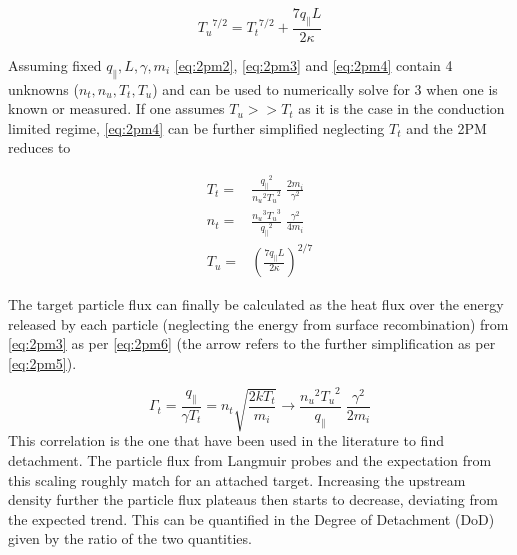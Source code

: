 \begin{equation}
{T_u}^{7/2} = {T_t}^{7/2} + \frac{7 q_{\parallel} L}{2 \kappa}
\label{eq:2pm4}
\end{equation}

Assuming fixed $q_{\parallel}, L, \gamma, m_i$ \autoref{eq:2pm2}, \ref{eq:2pm3} and \ref{eq:2pm4} contain 4 unknowns ($n_t, n_u, T_t, T_u$) and can be used to numerically solve for 3 when one is known or measured. If one assumes $T_u >> T_t$ as it is the case in the conduction limited regime, \autoref{eq:2pm4} can be further simplified neglecting $T_t$ and the 2PM reduces to

\begin{equation}
\begin{aligned}
T_t =& \frac{{q_{\parallel}}^2}{{n_u}^2 {T_u}^2} \; \frac{2m_i}{\gamma^2} \\
n_t =& \frac{{n_u}^3 {T_u}^3}{{q_{\parallel}}^2} \; \frac{\gamma^2}{4m_i} \\
T_u =& \left( \frac{7 q_{\parallel} L}{2 \kappa} \right)^{2/7}
\end{aligned}
\label{eq:2pm5}
\end{equation}

The target particle flux can finally be calculated as the heat flux over the energy released by each particle (neglecting the energy from surface recombination) from \autoref{eq:2pm3} as per \autoref{eq:2pm6} (the arrow refers to the further simplification as per \autoref{eq:2pm5}).

\begin{equation}
\Gamma_t = \frac{q_{\parallel}}{\gamma T_t} =  n_t \sqrt{\frac{2kT_t}{m_i}} \rightarrow \frac{{n_u}^2 {T_u}^2}{q_{\parallel}} \; \frac{\gamma^2}{2m_i}
\label{eq:2pm6}
\end{equation}
This correlation is the one that have been used in the literature to find detachment. The particle flux from Langmuir probes and the expectation from this scaling roughly match for an attached target. Increasing the upstream density further the particle flux plateaus then starts to decrease, deviating from the expected trend. This can be quantified in the Degree of Detachment (DoD) given by the ratio of the two quantities.\cite{Stangeby2001,Loarte1998}

